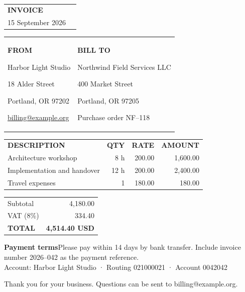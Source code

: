 \documentclass[a4paper]{article}
\begin{document}
\noindent{\color{accent}\rule{\linewidth}{4pt}}\\[10pt]
\begin{tabularx}{\linewidth}{@{}Xr@{}}
  {\Huge\bfseries\color{ink} INVOICE} &
  \begin{tabular}{r}\textbf{No. 2026--042}\\15 September 2026\end{tabular}
\end{tabularx}
\vspace{14pt}
\begin{tabularx}{\linewidth}{@{}X X@{}}
  \textbf{FROM}\par Harbor Light Studio\par 18 Alder Street\par Portland, OR 97202\par \href{mailto:billing@example.org}{billing@example.org}
  &
  \textbf{BILL TO}\par Northwind Field Services LLC\par 400 Market Street\par Portland, OR 97205\par Purchase order NF--118
\end{tabularx}
\vspace{18pt}
\begin{tabularx}{\linewidth}{@{}>{\raggedright\arraybackslash}X r r r@{}}
  \rowcolor{ink}\color{white}\textbf{DESCRIPTION} & \color{white}\textbf{QTY} & \color{white}\textbf{RATE} & \color{white}\textbf{AMOUNT}\\
  Architecture workshop & 8 h & 200.00 & 1,600.00\\
  Implementation and handover & 12 h & 200.00 & 2,400.00\\
  Travel expenses & 1 & 180.00 & 180.00\\
\end{tabularx}
\vspace{8pt}
\begin{flushright}\begin{tabular}{lr}
  Subtotal & 4,180.00\\ VAT (8\%) & 334.40\\[-2pt]
  \toprule \Large\textbf{TOTAL} & \Large\textbf{4,514.40 USD}
\end{tabular}\end{flushright}
\vfill
\noindent\colorbox{mist}{\parbox{\dimexpr\linewidth-2\fboxsep\relax}{\textbf{Payment terms}\quad Please pay within 14 days by bank transfer. Include invoice number 2026--042 as the payment reference.\\[3pt]Account: Harbor Light Studio · Routing 021000021 · Account 0042042}}
\vspace{10pt}
\noindent\small Thank you for your business. Questions can be sent to billing@example.org.
\end{document}
